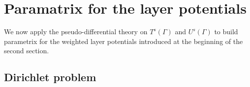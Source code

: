 \documentclass[a4paper]{article}
\begin{document}


\section{Paramatrix for the layer potentials}

We now apply the pseudo-differential theory on $T^s(\Gamma)$ and $U^s(\Gamma)$ to build parametrix for the weighted layer potentials introduced at the beginning of the second section. 

\subsection{Dirichlet problem}
\end{document}
